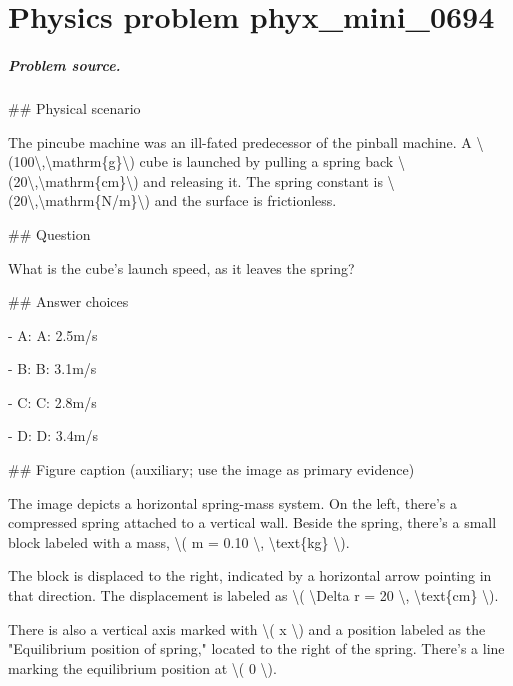 
\chapter{Physics problem phyx\_mini\_0694}
\label{ch:PhyXMiniProblems_problem_phyx_mini_0694}

\paragraph{Problem source.}
\#\# Physical scenario

The pincube machine was an ill-fated predecessor of the pinball machine. A \textbackslash{}(100\textbackslash{},\textbackslash{}mathrm\{g\}\textbackslash{}) cube is launched by pulling a spring back \textbackslash{}(20\textbackslash{},\textbackslash{}mathrm\{cm\}\textbackslash{}) and releasing it. The spring constant is \textbackslash{}(20\textbackslash{},\textbackslash{}mathrm\{N/m\}\textbackslash{}) and the surface is frictionless.

\#\# Question

What is the cube's launch speed, as it leaves the spring?

\#\# Answer choices

- A: A: 2.5m/s

- B: B: 3.1m/s

- C: C: 2.8m/s

- D: D: 3.4m/s

\#\# Figure caption (auxiliary; use the image as primary evidence)

The image depicts a horizontal spring-mass system. On the left, there's a compressed spring attached to a vertical wall. Beside the spring, there's a small block labeled with a mass, \textbackslash{}( m = 0.10 \textbackslash{}, \textbackslash{}text\{kg\} \textbackslash{}).

The block is displaced to the right, indicated by a horizontal arrow pointing in that direction. The displacement is labeled as \textbackslash{}( \textbackslash{}Delta r = 20 \textbackslash{}, \textbackslash{}text\{cm\} \textbackslash{}). 

There is also a vertical axis marked with \textbackslash{}( x \textbackslash{}) and a position labeled as the "Equilibrium position of spring," located to the right of the spring. There's a line marking the equilibrium position at \textbackslash{}( 0 \textbackslash{}).

